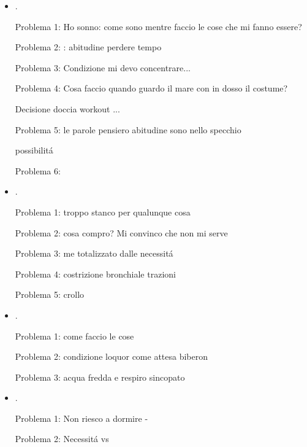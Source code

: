 \begin{itemize}
Problema 1: Il corpo mi agisce

Problema 2: Gli impulsi sono lo schema

Problema 3: Reazioni confusione/agitazione situazioni pertubanti

Problema 4: Confusione post L-sit

Problema 5: Voglia di casa dopo birra e gelato

\item {}.

Problema 1: Ho sonno: come sono mentre faccio le cose che mi fanno essere?

Problema 2: : abitudine perdere tempo

Problema 3: Condizione mi devo concentrare...

Problema 4: Cosa faccio quando guardo il mare con in dosso il costume?

Decisione doccia workout ...

Problema 5: le parole pensiero abitudine sono nello specchio

possibilit\'a

Problema 6: 

\item {}.

Problema 1: troppo stanco per qualunque cosa

Problema 2: cosa compro? Mi convinco che non mi serve

Problema 3: me totalizzato dalle necessit\'a

Problema 4: costrizione bronchiale trazioni

Problema 5: crollo

\item {}.

Problema 1: come faccio le cose

Problema 2: condizione loquor come  attesa biberon

Problema 3: acqua fredda e respiro sincopato


\item {}.

Problema 1: Non riesco a dormire - 

Problema 2: Necessit\'a vs 


\end{itemize}
